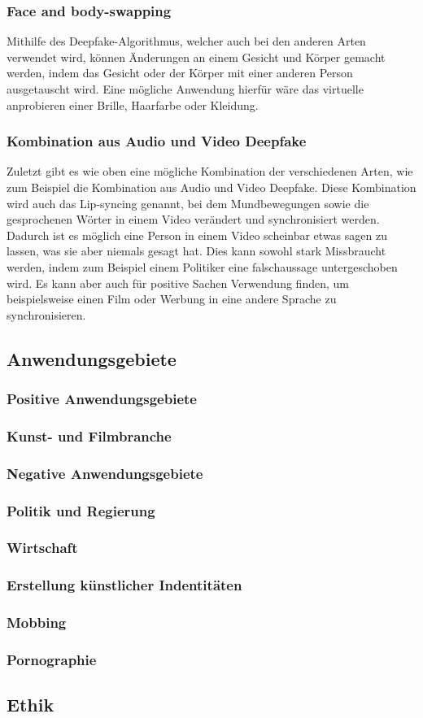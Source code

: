 \subsubsection{Face and body-swapping}
Mithilfe des Deepfake-Algorithmus, welcher auch bei den anderen Arten verwendet wird, können Änderungen an einem Gesicht und Körper gemacht werden, indem das Gesicht oder der Körper mit einer anderen Person ausgetauscht wird. Eine mögliche Anwendung hierfür wäre das virtuelle anprobieren einer Brille, Haarfarbe oder Kleidung.\cite{ResearchGate}

\subsubsection{Kombination aus Audio und Video Deepfake}
Zuletzt gibt es wie oben eine mögliche Kombination der verschiedenen Arten, wie zum Beispiel die Kombination aus Audio und Video Deepfake.
Diese Kombination wird auch das Lip-syncing genannt, bei dem Mundbewegungen sowie die gesprochenen Wörter in einem Video verändert und synchronisiert werden.
Dadurch ist es möglich eine Person in einem Video scheinbar etwas sagen zu lassen, was sie aber niemals gesagt hat. Dies kann sowohl stark Missbraucht werden, indem zum Beispiel einem Politiker eine falschaussage untergeschoben wird.
Es kann aber auch für positive Sachen Verwendung finden, um beispielsweise einen Film oder Werbung in eine andere Sprache zu synchronisieren.\cite{ResearchGate}

\subsection{Anwendungsgebiete}
\subsubsection{Positive Anwendungsgebiete}
\subsubsection{Kunst- und Filmbranche}
\subsubsection{Negative Anwendungsgebiete}
\subsubsection{Politik und Regierung}
\subsubsection{Wirtschaft}
\subsubsection{Erstellung künstlicher Indentitäten}
\subsubsection{Mobbing}
\subsubsection{Pornographie}


\subsection{Ethik}